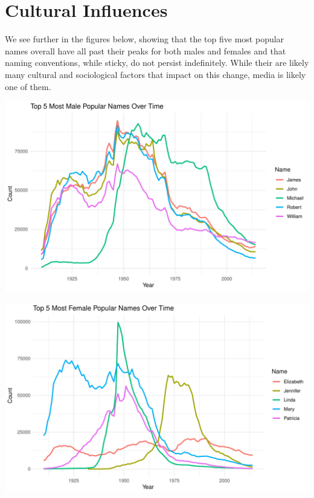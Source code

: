 \documentclass[11pt,preprint, authoryear]{elsarticle}
\let\origfigure\figure
\let\endorigfigure\endfigure
\renewenvironment{figure}[1][2] {
    \expandafter\origfigure\expandafter[H]
} {
    \endorigfigure
}
\numberwithin{equation}{section}
\numberwithin{figure}{section}
\numberwithin{table}{section}
\begin{document}
\section*{Cultural Influences}\label{cultural-influences}

We see further in the figures below, showing that the top five most
popular names overall have all past their peaks for both males and
females and that naming conventions, while sticky, do not persist
indefinitely. While their are likely many cultural and sociological
factors that impact on this change, media is likely one of them.

\begin{figure}[H]

{\centering \includegraphics{Question1_files/figure-latex/unnamed-chunk-2-1}

}

\caption{Top 5 Male Names Over Time.\label{Figure2}}\label{fig:unnamed-chunk-2}
\end{figure}

\begin{figure}[H]

{\centering \includegraphics{Question1_files/figure-latex/unnamed-chunk-3-1}

}

\caption{Top 5 Female Names Over Time.\label{Figure3}}\label{fig:unnamed-chunk-3}
\end{figure}
\hfill
\end{document}
